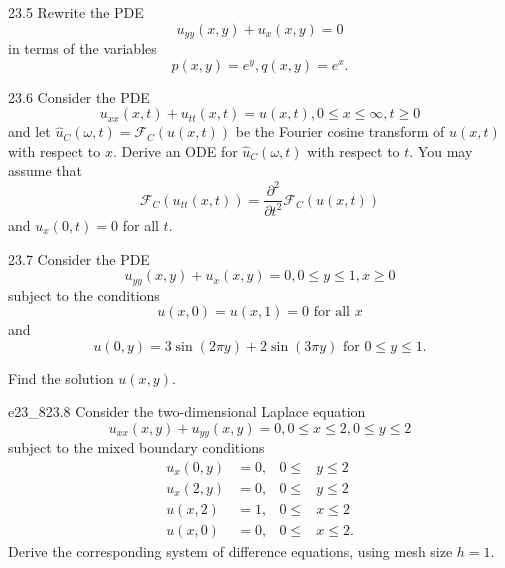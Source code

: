 \begin{problem}{23.5}
  Rewrite the PDE
  \begin{equation*}
    u_{y y}(x,y) + u_x(x,y) = 0
  \end{equation*}
  in terms of the variables
  \begin{equation*}
    p(x,y) = e^{y}, q(x,y) = e^{x}
  .\end{equation*}
\end{problem}

\begin{problem}{23.6}
  Consider the PDE
  \begin{equation*}
    u_{x x}(x,t) + u_{t t}(x,t) = u(x,t), 0 \leq x \leq \infty, t \geq 0
  \end{equation*}
  and let $\hat{u}_C(\omega, t) = \mathcal{F}_C (u(x,t))$ be the Fourier cosine transform of $u(x,t)$ with respect to $x$.
  Derive an ODE for $\hat{u}_C(\omega,t)$ with respect to $t$.
  You may assume that
  \begin{equation*}
    \mathcal{F}_C(u_{t t}(x,t)) = \frac{\partial ^2}{\partial t^2} \mathcal{F}_C \left( u(x,t) \right)
  \end{equation*}
  and $u_x(0,t) = 0$ for all $t$.
\end{problem}

\begin{problem}{23.7}
  Consider the PDE
  \begin{equation*}
    u_{y y}(x,y) + u_x(x,y) = 0, 0 \leq y \leq 1, x \geq 0
  \end{equation*}
  subject to the conditions
  \begin{equation*}
    u(x,0) = u(x,1) = 0 \text{ for all } x
  \end{equation*}
  and
  \begin{equation*}
    u(0,y) = 3 \sin (2\pi y) + 2 \sin (3\pi y) \text{ for } 0 \leq y \leq 1
  .\end{equation*}
  
  Find the solution $u(x,y)$.
\end{problem}

\begin{problemwithimage}{e23_8}{23.8}
  Consider the two-dimensional Laplace equation
  \begin{equation*}
    u_{x x}(x,y) + u_{yy}(x,y) = 0, 0 \leq x \leq 2, 0 \leq y \leq 2
  \end{equation*}
  subject to the mixed boundary conditions
  \begin{align*}
    u_x(0,y) &= 0, & 0 \leq &y \leq 2 \\
    u_x(2,y) &= 0, & 0 \leq &y \leq 2 \\
    u(x,2) &= 1, & 0 \leq &x \leq 2 \\
    u(x,0) &= 0, & 0 \leq &x \leq 2
  .\end{align*}
  Derive the corresponding system of difference equations, using mesh size $h = 1$.
\end{problemwithimage}

